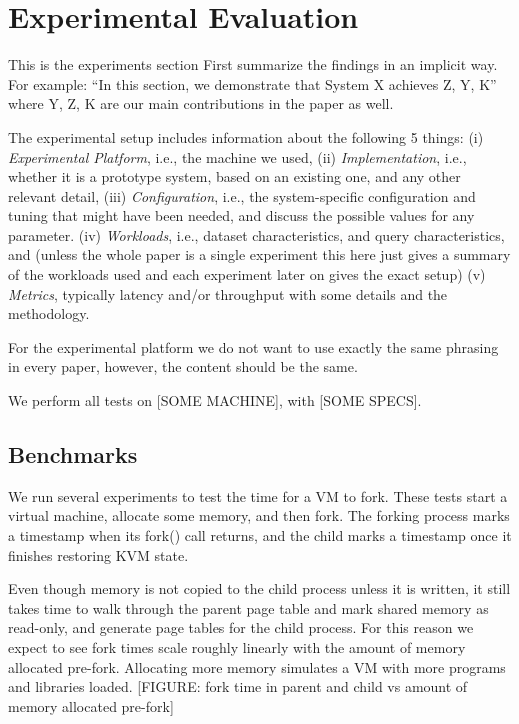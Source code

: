\section{Experimental Evaluation} \label{sec:experiments}
This is the experiments section
First summarize the findings in an implicit way. For example:
``In this section, we demonstrate that System X achieves Z, Y, K''
where Y, Z, K are our main contributions in the paper as well.

The experimental setup includes information about the following 5 things:
(i) \textit{Experimental Platform}, i.e., the machine we used,
(ii) \textit{Implementation}, i.e., whether it is a prototype system, based on an existing one, and any other relevant detail,
(iii) \textit{Configuration}, i.e., the system-specific configuration and tuning that might have been needed, and discuss the possible values for any parameter.
(iv) \textit{Workloads}, i.e., dataset characteristics, and query characteristics, and (unless the whole paper is a single experiment this here just gives a summary of the workloads used and each experiment later on gives the exact setup)
(v) \textit{Metrics}, typically latency and/or throughput with some details and the
methodology.

For the experimental platform we do
not want to use exactly the same phrasing in every paper, however, the content should
be the same.

We perform all tests on [SOME MACHINE], with [SOME SPECS].

\subsection{Benchmarks}

 We run several experiments to test the time for a VM to fork. These tests start a virtual machine, allocate some memory, and then fork. The forking process marks a timestamp when its fork() call returns, and the child marks a timestamp once it finishes restoring KVM state.

Even though memory is not copied to the child process unless it is written, it still takes time to walk through the parent page table and mark shared memory as read-only, and generate page tables for the child process. For this reason we expect to see fork times scale roughly linearly with the amount of memory allocated pre-fork. Allocating more memory simulates a VM with more programs and libraries loaded. [FIGURE: fork time in parent and child vs amount of memory allocated pre-fork]

